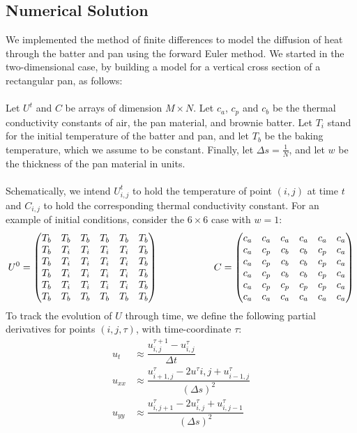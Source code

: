 \documentclass[12pt]{reedmcm}
\begin{document}
\subsection{Numerical Solution}
We implemented the method of finite differences to model the diffusion of heat through the batter and pan using the forward Euler method.  We started in the two-dimensional case, by building a model for a vertical cross section of a rectangular pan, as follows:\\
\\
Let $U^t$ and $C$ be arrays of dimension $M \times N$.  Let $c_a$, $c_p$ and $c_b$ be the thermal conductivity constants of air, the pan material, and brownie batter.  Let $T_i$ stand for the initial temperature of the batter and pan, and let $T_b$ be the baking temperature, which we assume to be constant.  Finally, let $\Delta s = \frac{1}{N}$, and let $w$ be the thickness of the pan material in units.\\
\\
Schematically, we intend $U^t_{i,j}$ to hold the temperature of point $(i,j)$ at time $t$ and $C_{i,j}$ to hold the corresponding thermal conductivity constant.  For an example of initial conditions, consider the $6 \times 6$ case with $w = 1$:
\[U^0 = \begin{pmatrix} T_b&T_b&T_b&T_b&T_b&T_b\\
					T_b&T_i &T_i&T_i&T_i&T_b\\
					T_b&T_i &T_i&T_i&T_i&T_b\\
					T_b&T_i &T_i&T_i&T_i&T_b\\
					T_b&T_i &T_i&T_i&T_i&T_b\\
					T_b&T_b&T_b&T_b&T_b&T_b \end{pmatrix} \hspace{20mm}
  C = \begin{pmatrix} c_a&c_a&c_a&c_a&c_a&c_a\\
				   c_a &c_p &c_b&c_b&c_p&c_a\\
				    c_a &c_p &c_b&c_b&c_p&c_a\\
  				 c_a &c_p &c_b&c_b&c_p&c_a\\
				 c_a &c_p &c_p&c_p&c_p&c_a\\
				c_a&c_a&c_a&c_a&c_a&c_a \end{pmatrix} \]		
To track the evolution of $U$ through time, we define the following partial derivatives for points $(i,j,\tau)$, with time-coordinate $\tau$: \begin{align*}
u_t &\approx \dfrac{u_{i,j}^{\tau+1} - u_{i,j}^\tau}{\Delta t}\\
u_{xx} &\approx \dfrac{u_{i+1,j}^\tau - 2u^\tau{i,j} + u_{i-1,j}^\tau}{(\Delta s)^2}\\
u_{yy} &\approx \dfrac{u_{i,j+1}^\tau - 2u_{i,j}^\tau + u_{i,j-1}^\tau}{(\Delta s)^2} \end{align*}
\end{document}
